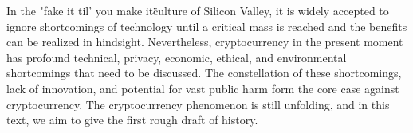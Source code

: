 In the "fake it til' you make it\" culture of Silicon Valley, it is
widely accepted to ignore shortcomings of technology until a critical
mass is reached and the benefits can be realized in hindsight.
Nevertheless, cryptocurrency in the present moment has profound
technical, privacy, economic, ethical, and environmental shortcomings
that need to be discussed. The constellation of these shortcomings, lack
of innovation, and potential for vast public harm form the core case
against cryptocurrency. The cryptocurrency phenomenon is still
unfolding, and in this text, we aim to give the first rough draft of
history.

